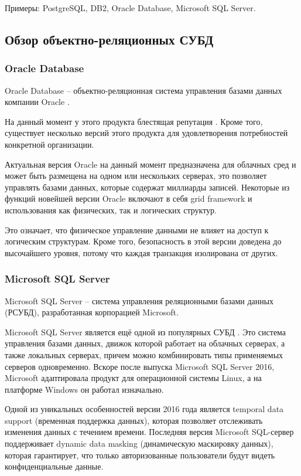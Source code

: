\documentclass[a4paper,14pt]{extreport}
\begin{document}
Примеры: PostgreSQL, DB2, Oracle Database, Microsoft SQL Server.


\subsection{Обзор объектно-реляционных СУБД}

\subsubsection*{Oracle Database}

Oracle Database \cite{orc_db} -- объектно-реляционная система управления базами данных компании Oracle \cite{orc}.

На данный момент у этого продукта блестящая репутация \cite{cmp_db}. Кроме того, существует несколько версий этого продукта для удовлетворения потребностей конкретной организации.

Актуальная версия Oracle на данный момент предназначена для облачных сред и может быть размещена на одном или нескольких серверах, это позволяет управлять базами данных, которые содержат миллиарды записей. Некоторые из функций новейшей версии Oracle включают в себя grid framework и использования как физических, так и логических структур.

Это означает, что физическое управление данными не влияет на доступ к логическим структурам. Кроме того, безопасность в этой версии доведена до высочайшего уровня, потому что каждая транзакция изолирована от других.

\subsubsection*{Microsoft SQL Server}

Microsoft SQL Server \cite{mssql} -- система управления реляционными базами данных (РСУБД), разработанная корпорацией Microsoft.

Microsoft SQL Server является ещё одной из популярных СУБД \cite{cmp_db}. Это система управления базами данных, движок которой работает на облачных серверах, а также локальных серверах, причем можно комбинировать типы применяемых серверов одновременно. Вскоре после выпуска Microsoft SQL Server 2016, Microsoft адаптировала продукт для операционной системы Linux, а на платформе Windows он работал изначально.

Одной из уникальных особенностей версии 2016 года является temporal data support (временная поддержка данных), которая позволяет отслеживать изменения данных с течением времени. Последняя версия Microsoft SQL-сервер поддерживает dynamic data masking (динамическую маскировку данных), которая гарантирует, что только авторизованные пользователи будут видеть конфиденциальные данные.
\end{document}
